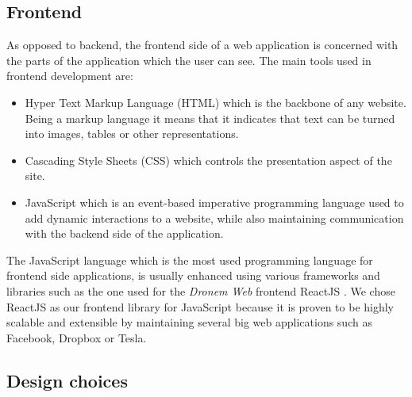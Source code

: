 \subsection{Frontend}\label{FE}
As opposed to backend, the frontend side of a web application is concerned with the parts of the application which the user can see. The main tools used in frontend development are:
\begin{itemize}
    \item Hyper Text Markup Language (HTML) which is the backbone of any website. Being a markup language it means that it indicates that text can be turned into images, tables or other representations.
    \item Cascading Style Sheets (CSS) which controls the presentation aspect of the site.
    \item JavaScript which is an event-based imperative programming language used to add dynamic interactions to a website, while also maintaining communication with the backend side of the application.
\end{itemize}
\par The JavaScript language which is the most used programming language for frontend side applications, is usually enhanced using various frameworks and libraries such as the one used for the \emph{Dronem Web} frontend ReactJS \cite{react}. We chose ReactJS as our frontend library for JavaScript because it is proven to be highly scalable and extensible by maintaining several big web applications such as Facebook, Dropbox or Tesla.
\subsection{Design choices}


